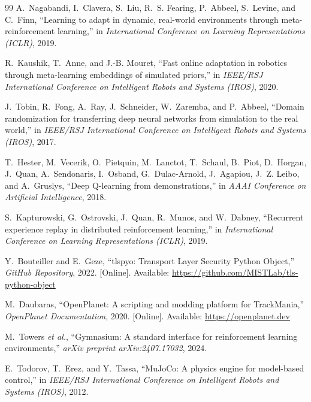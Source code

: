 \documentclass[conference]{IEEEtran}
\begin{document}
\begin{thebibliography}{99}
A.~Nagabandi, I.~Clavera, S.~Liu, R.~S. Fearing, P.~Abbeel, S.~Levine, and C.~Finn, ``Learning to adapt in dynamic, real-world environments through meta-reinforcement learning,'' in \emph{International Conference on Learning Representations (ICLR)}, 2019.

R.~Kaushik, T.~Anne, and J.-B. Mouret, ``Fast online adaptation in robotics through meta-learning embeddings of simulated priors,'' in \emph{IEEE/RSJ International Conference on Intelligent Robots and Systems (IROS)}, 2020.

J.~Tobin, R.~Fong, A.~Ray, J.~Schneider, W.~Zaremba, and P.~Abbeel, ``Domain randomization for transferring deep neural networks from simulation to the real world,'' in \emph{IEEE/RSJ International Conference on Intelligent Robots and Systems (IROS)}, 2017.

T.~Hester, M.~Vecerik, O.~Pietquin, M.~Lanctot, T.~Schaul, B.~Piot, D.~Horgan, J.~Quan, A.~Sendonaris, I.~Osband, G.~Dulac-Arnold, J.~Agapiou, J.~Z. Leibo, and A.~Gruslys, ``Deep Q-learning from demonstrations,'' in \emph{AAAI Conference on Artificial Intelligence}, 2018.

S.~Kapturowski, G.~Ostrovski, J.~Quan, R.~Munos, and W.~Dabney, ``Recurrent experience replay in distributed reinforcement learning,'' in \emph{International Conference on Learning Representations (ICLR)}, 2019.

Y.~Bouteiller and E.~Geze, ``tlspyo: Transport Layer Security Python Object,'' \emph{GitHub Repository}, 2022. [Online]. Available: \url{https://github.com/MISTLab/tls-python-object}

M.~Daubaras, ``OpenPlanet: A scripting and modding platform for TrackMania,'' \emph{OpenPlanet Documentation}, 2020. [Online]. Available: \url{https://openplanet.dev}

M.~Towers \emph{et al.}, ``Gymnasium: A standard interface for reinforcement learning environments,'' \emph{arXiv preprint arXiv:2407.17032}, 2024.

E.~Todorov, T.~Erez, and Y.~Tassa, ``MuJoCo: A physics engine for model-based control,'' in \emph{IEEE/RSJ International Conference on Intelligent Robots and Systems (IROS)}, 2012.

\end{thebibliography}
\endgroup
\end{document}
